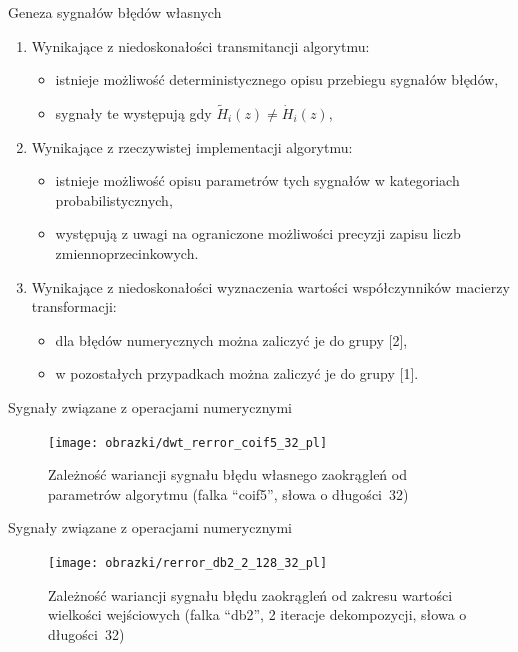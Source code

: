 \documentclass[12pt, polish, aspectratio = 169]{slides}
\begin{document}
\begin{frame}{Geneza sygnałów błędów własnych}
\begin{enumerate}
\item Wynikające z niedoskonałości transmitancji algorytmu:
	\begin{itemize}
	\item istnieje możliwość deterministycznego opisu przebiegu sygnałów błędów,
	\item sygnały te występują gdy $\tilde{H}_{i}(z) \ne \dot{H}_{i}(z)$,
	\end{itemize}
\item Wynikające z rzeczywistej implementacji algorytmu:
	\begin{itemize}
	\item istnieje możliwość opisu parametrów tych sygnałów w kategoriach probabilistycznych,
	\item występują z uwagi na ograniczone możliwości precyzji zapisu liczb zmiennoprzecinkowych.
	\end{itemize}
\item Wynikające z niedoskonałości wyznaczenia wartości współczynników macierzy transformacji:
	\begin{itemize}
	\item dla błędów numerycznych można zaliczyć je do grupy [2],
	\item w pozostałych przypadkach można zaliczyć je do grupy [1].
	\end{itemize}
\end{enumerate}
\end{frame}

\begin{frame}{Sygnały związane z operacjami numerycznymi}
\begin{figure}
\texttt{[image: obrazki/dwt\_rerror\_coif5\_32\_pl]}
\caption{Zależność wariancji sygnału błędu własnego zaokrągleń od parametrów algorytmu (falka \enquote{coif5}, słowa o długości~\qty{32}{\bitOw})}
\end{figure}
\end{frame}

\begin{frame}{Sygnały związane z operacjami numerycznymi}
\begin{figure}
\texttt{[image: obrazki/rerror\_db2\_2\_128\_32\_pl]}
\caption{Zależność wariancji sygnału błędu zaokrągleń od zakresu wartości wielkości wejściowych (falka \enquote{db2}, 2 iteracje dekompozycji, słowa o długości~\qty{32}{\bitOw})}
\end{figure}
\end{frame}
\end{document}
